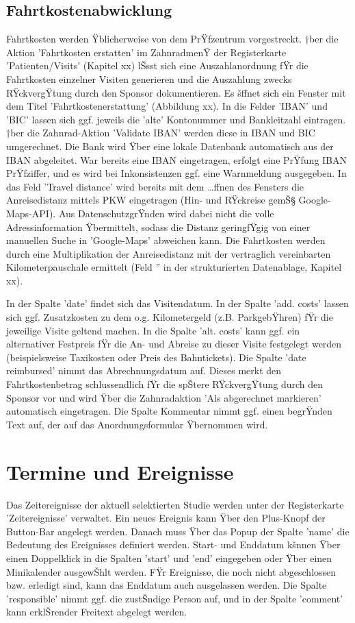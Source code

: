 \documentclass[11pt,oneside]{scrbook}
\begin{document}
\section{Fahrtkostenabwicklung}
Fahrtkosten werden Ÿblicherweise von dem PrŸfzentrum vorgestreckt. †ber  die Aktion 'Fahrtkosten erstatten' im ZahnradmenŸ der Registerkarte 'Patienten/Visits' (Kapitel xx) lŠsst sich eine Auszahlanordnung fŸr die Fahrtkosten einzelner Visiten generieren und die Auszahlung zwecks RŸckvergŸtung durch den Sponsor dokumentieren. Es šffnet sich ein Fenster mit dem Titel 'Fahrtkostenerstattung' (Abbildung xx). In die Felder 'IBAN' und 'BIC' lassen sich ggf. jeweils die 'alte' Kontonummer und Bankleitzahl eintragen. †ber die Zahnrad-Aktion 'Validate IBAN' werden diese in IBAN und BIC umgerechnet. Die Bank wird Ÿber eine lokale Datenbank automatisch aus der IBAN abgeleitet. War bereits eine IBAN eingetragen, erfolgt eine PrŸfung IBAN PrŸfziffer, und es wird bei Inkonsistenzen ggf. eine Warnmeldung ausgegeben.  In das Feld 'Travel distance' wird bereits mit dem …ffnen des Fensters  die Anreisedistanz mittels PKW eingetragen (Hin- und RŸckreise gemŠ§ Google-Maps-API). Aus DatenschutzgrŸnden wird dabei nicht die volle Adressinformation Ÿbermittelt, sodass die Distanz geringfŸgig von einer manuellen Suche in 'Google-Maps' abweichen kann. Die Fahrtkosten werden durch eine Multiplikation der Anreisedistanz mit der vertraglich vereinbarten Kilometerpauschale ermittelt (Feld '' in der strukturierten Datenablage, Kapitel xx).

In der Spalte 'date' findet sich das Visitendatum. In der Spalte 'add. costs' lassen sich ggf. Zusatzkosten zu dem o.g. Kilometergeld (z.B. ParkgebŸhren) fŸr die jeweilige Visite geltend machen. In die Spalte 'alt. costs' kann ggf. ein alternativer Festpreis fŸr die An- und Abreise zu dieser Visite festgelegt werden (beispielsweise Taxikosten oder Preis des Bahntickets). Die Spalte 'date reimbursed' nimmt das Abrechnungsdatum auf. Dieses merkt den Fahrtkostenbetrag schlussendlich fŸr die spŠtere RŸckvergŸtung durch den Sponsor vor und wird Ÿber die Zahnradaktion 'Als abgerechnet markieren' automatisch eingetragen. Die Spalte Kommentar nimmt ggf. einen begrŸnden Text auf, der  auf das Anordnungsformular Ÿbernommen wird.

\chapter{Termine und Ereignisse}
Das Zeitereignisse der aktuell selektierten Studie werden  unter der Registerkarte 'Zeitereignisse' verwaltet. Ein neues Ereignis kann Ÿber den Plus-Knopf der Button-Bar  angelegt werden.   Danach muss Ÿber das Popup der Spalte 'name' die Bedeutung des Ereignisses definiert werden.  Start- und Enddatum kšnnen Ÿber einen Doppelklick in die Spalten 'start' und 'end' eingegeben oder Ÿber einen Minikalender ausgewŠhlt werden. FŸr Ereignisse, die noch nicht abgeschlossen bzw. erledigt sind, kann das Enddatum auch ausgelassen werden. Die Spalte 'responsible' nimmt ggf. die zustŠndige Person auf, und in der Spalte 'comment' kann erklŠrender Freitext abgelegt werden.
\end{document}
